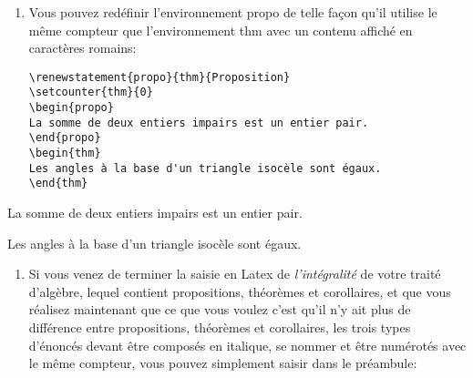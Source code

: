 \documentclass[french,ColorTheme=USAF,FontSize=10pt]{tango}
\newcommand\TO[1]{\textsf{#1}}
\begin{document}
\begin{example}[Exemples]
\begin{enumerate}
\item Vous pouvez redéfinir l'environnement \TO{propo} de telle façon qu'il utilise le même compteur que l'environnement  \TO{thm} avec un contenu affiché en caractères romains:
\begin{tcolorbox}
\begin{verbatim}
\renewstatement{propo}{thm}{Proposition}
\setcounter{thm}{0}
\begin{propo}
La somme de deux entiers impairs est un entier pair.
\end{propo}
\begin{thm}
Les angles à la base d'un triangle isocèle sont égaux.
\end{thm}
\end{verbatim}
\end{tcolorbox}
\end{enumerate}
\setcounter{thm}{0}
\begin{propo}
La somme de deux entiers impairs est un entier pair.
\end{propo}
\begin{thm}
Les angles à la base d'un triangle isocèle sont égaux.
\end{thm}

\begin{enumerate}[resume]
\item Si vous venez de terminer la saisie en Latex de \emph{l'intégralité} de votre traité d'algèbre, lequel contient propositions, théorèmes et corollaires, et que vous réalisez maintenant que ce que vous voulez c'est qu'il n'y ait plus de différence entre propositions, théorèmes et corollaires, les trois types d'énoncés devant être composés en italique, se nommer  et être numérotés avec le même compteur, vous pouvez simplement saisir dans le préambule: 


\end{enumerate}
\end{example}
\end{document}
